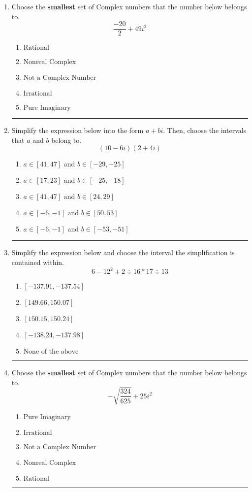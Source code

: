 \documentclass[14pt]{extbook}
\newcommand{\litem}[1]{\item#1\hspace*{-1cm}\rule{\textwidth}{0.4pt}}
\begin{document}
\begin{enumerate}
{\begin{enumerate}[label=\Alph*.]
\end{enumerate} }
\litem{
Choose the \textbf{smallest} set of Complex numbers that the number below belongs to.\[ \frac{-20}{2}+49i^2 \]\begin{enumerate}[label=\Alph*.]
\item \( \text{Rational} \)
\item \( \text{Nonreal Complex} \)
\item \( \text{Not a Complex Number} \)
\item \( \text{Irrational} \)
\item \( \text{Pure Imaginary} \)

\end{enumerate} }
\litem{
Simplify the expression below into the form $a+bi$. Then, choose the intervals that $a$ and $b$ belong to.\[ (10 - 6 i)(2 + 4 i) \]\begin{enumerate}[label=\Alph*.]
\item \( a \in [41, 47] \text{ and } b \in [-29, -25] \)
\item \( a \in [17, 23] \text{ and } b \in [-25, -18] \)
\item \( a \in [41, 47] \text{ and } b \in [24, 29] \)
\item \( a \in [-6, -1] \text{ and } b \in [50, 53] \)
\item \( a \in [-6, -1] \text{ and } b \in [-53, -51] \)

\end{enumerate} }
\litem{
Simplify the expression below and choose the interval the simplification is contained within.\[ 6 - 12^2 + 2 \div 16 * 17 \div 13 \]\begin{enumerate}[label=\Alph*.]
\item \( [-137.91, -137.54] \)
\item \( [149.66, 150.07] \)
\item \( [150.15, 150.24] \)
\item \( [-138.24, -137.98] \)
\item \( \text{None of the above} \)

\end{enumerate} }
\litem{
Choose the \textbf{smallest} set of Complex numbers that the number below belongs to.\[ -\sqrt{\frac{324}{625}} + 25i^2 \]\begin{enumerate}[label=\Alph*.]
\item \( \text{Pure Imaginary} \)
\item \( \text{Irrational} \)
\item \( \text{Not a Complex Number} \)
\item \( \text{Nonreal Complex} \)
\item \( \text{Rational} \)


\end{enumerate}}
\end{enumerate}
\end{document}
